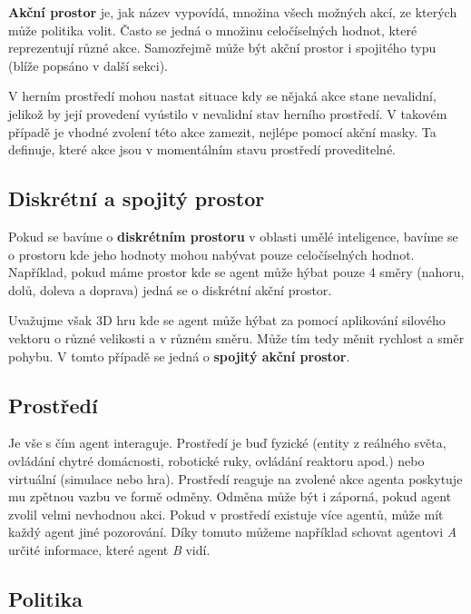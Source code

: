 \textbf{Akční prostor} je, jak název vypovídá, množina všech možných akcí, ze kterých může politika volit.
Často se jedná o množinu celočíselných hodnot, které reprezentují různé akce.
Samozřejmě může být akční prostor i spojitého typu (blíže popsáno v další sekci).

V herním prostředí mohou nastat situace kdy se nějaká akce stane nevalidní, jelikož by její provedení vyústilo v nevalidní stav herního prostředí.
V takovém případě je vhodné zvolení této akce zamezit, nejlépe pomocí akční masky.
Ta definuje, které akce jsou v momentálním stavu prostředí proveditelné.

\subsection{Diskrétní a spojitý prostor}\label{subsec:diskretni-a-spojity-prostor}

Pokud se bavíme o \textbf{diskrétním prostoru} v oblasti umělé inteligence, bavíme se o prostoru kde jeho hodnoty mohou nabývat pouze celočíselných hodnot.
Například, pokud máme prostor kde se agent může hýbat pouze 4 směry (nahoru, dolů, doleva a doprava) jedná se o diskrétní akční prostor.

\bigskip

Uvažujme však 3D hru kde se agent může hýbat za pomocí aplikování silového vektoru o různé velikosti a v různém směru.
Může tím tedy měnit rychlost a směr pohybu.
V tomto případě se jedná o \textbf{spojitý akční prostor}.

\subsection{Prostředí}\label{subsec:prostredi2}

Je vše s čím agent interaguje.
Prostředí je buď fyzické (entity z reálného světa, ovládání chytré domácnosti, robotické ruky, ovládání reaktoru apod.) nebo virtuální (simulace nebo hra).
Prostředí reaguje na zvolené akce agenta poskytuje mu zpětnou vazbu ve formě odměny.
Odměna může být i záporná, pokud agent zvolil velmi nevhodnou akci.
Pokud v prostředí existuje více agentů, může mít každý agent jiné pozorování.
Díky tomuto můžeme například schovat agentovi \textit{A} určité informace, které agent \textit{B} vidí.

\subsection{Politika}\label{subsec:politika}

